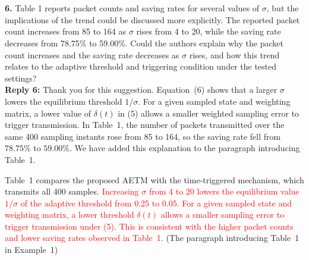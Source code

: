 \documentclass[10pt,fleqn]{article}
\begin{document}
~\\
\\
\textbf{6.} Table 1 reports packet counts and saving rates for several values of $\sigma$, but the implications of the trend could be discussed more explicitly. The reported packet count increases from 85 to 164 as $\sigma$ rises from 4 to 20, while the saving rate decreases from 78.75\% to 59.00\%. Could the authors explain why the packet count increases and the saving rate decreases as $\sigma$ rises, and how this trend relates to the adaptive threshold and triggering condition under the tested settings?
\\[10pt]
\begingroup
\setlength{\parskip}{6pt}
\indent \textbf{Reply 6:} Thank you for this suggestion. Equation~(6) shows that a larger $\sigma$ lowers the equilibrium threshold $1/\sigma$. For a given sampled state and weighting matrix, a lower value of $\delta(t)$ in (5) allows a smaller weighted sampling error to trigger transmission. In Table~1, the number of packets transmitted over the same 400 sampling instants rose from 85 to 164, so the saving rate fell from $78.75\%$ to $59.00\%$. We have added this explanation to the paragraph introducing Table~1.\par
\noindent Table~1 compares the proposed AETM with the time-triggered mechanism, which transmits all 400 samples. \textcolor{red}{Increasing $\sigma$ from 4 to 20 lowers the equilibrium value $1/\sigma$ of the adaptive threshold from 0.25 to 0.05. For a given sampled state and weighting matrix, a lower threshold $\delta(t)$ allows a smaller sampling error to trigger transmission under (5). This is consistent with the higher packet counts and lower saving rates observed in Table~1.} (The paragraph introducing Table~1 in Example~1)\par
\endgroup
\end{document}
